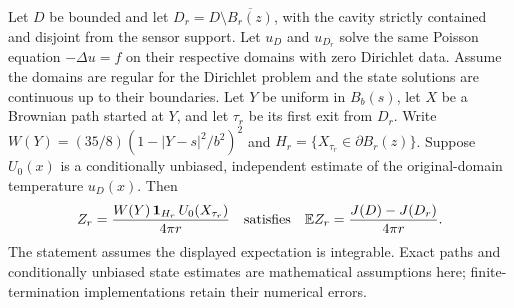 \begin{proposition}
Let $D$ be bounded and let $D_r=D\setminus\overline{B_r(z)}$, with the cavity strictly contained and
disjoint from the sensor support. Let $u_D$ and $u_{D_r}$ solve the same Poisson equation $-\Delta u=f$ on their respective domains with zero Dirichlet data. Assume the domains are regular for the
Dirichlet problem and the state solutions are continuous up to their boundaries.
Let $Y$ be uniform in $B_b(s)$, let $X$ be a Brownian path started at $Y$, and
let $\tau_r$ be its first exit from $D_r$. Write
$W(Y)=(35/8)(1-|Y-s|^2/b^2)^2$ and
$H_r=\{X_{\tau_r}\in\partial B_r(z)\}$. Suppose $U_0(x)$ is a conditionally
unbiased, independent estimate of the original-domain temperature $u_D(x)$.
Then
\[
 Z_r=\frac{W(Y)\,\mathbf1_{H_r}\,U_0(X_{\tau_r})}{4\pi r}
 \quad\hbox{satisfies}\quad
 \mathbb E Z_r=\frac{J(D)-J(D_r)}{4\pi r}.
\]
The statement assumes the displayed expectation is integrable. Exact paths and
conditionally unbiased state estimates are mathematical assumptions here;
finite-termination implementations retain their numerical errors.
\end{proposition}
